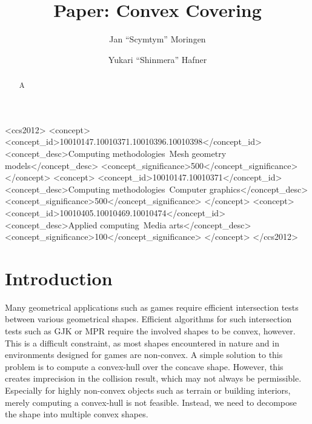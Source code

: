 \documentclass[format=sigconf]{acmart}
\begin{document}
\title{Paper: Convex Covering}

\author{Jan ``Scymtym'' Moringen}
\author{Yukari ``Shinmera'' Hafner}

\begin{CCSXML}
  <ccs2012>
  <concept>
  <concept_id>10010147.10010371.10010396.10010398</concept_id>
  <concept_desc>Computing methodologies~Mesh geometry models</concept_desc>
  <concept_significance>500</concept_significance>
  </concept>
  <concept>
  <concept_id>10010147.10010371</concept_id>
  <concept_desc>Computing methodologies~Computer graphics</concept_desc>
  <concept_significance>500</concept_significance>
  </concept>
  <concept>
  <concept_id>10010405.10010469.10010474</concept_id>
  <concept_desc>Applied computing~Media arts</concept_desc>
  <concept_significance>100</concept_significance>
  </concept>
  </ccs2012>
\end{CCSXML}


\begin{abstract}
  A
\end{abstract}


\maketitle

\def\abovecaptionskip{1pt}
\def\listingautorefname{Listing}
\def\figureautorefname{Figure}

\section{Introduction}\label{introduction}
Many geometrical applications such as games require efficient intersection tests between various geometrical shapes. Efficient algorithms for such intersection tests such as GJK\cite{gilbert1988fast} or MPR\cite{snethen2008xenocollide} require the involved shapes to be convex, however. This is a difficult constraint, as most shapes encountered in nature and in environments designed for games are non-convex. A simple solution to this problem is to compute a convex-hull over the concave shape. However, this creates imprecision in the collision result, which may not always be permissible. Especially for highly non-convex objects such as terrain or building interiors, merely computing a convex-hull is not feasible.
Instead, we need to decompose the shape into multiple convex shapes.
\end{document}
